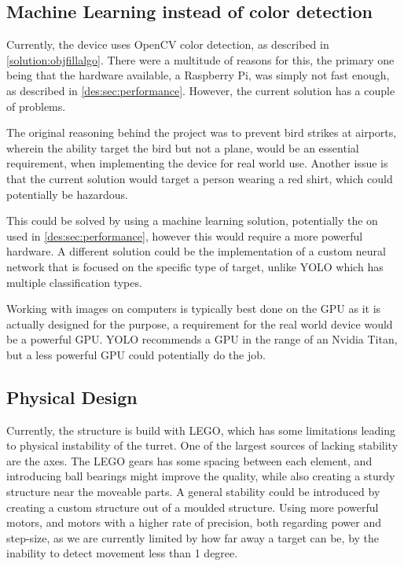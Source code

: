 \subsection{Machine Learning instead of color detection}

Currently, the device uses OpenCV color detection, as described in \autoref{solution:objfillalgo}.
There were a multitude of reasons for this, the primary one being that the hardware available, a Raspberry Pi, was simply not fast enough, as described in \autoref{des:sec:performance}.
However, the current solution has a couple of problems.

The original reasoning behind the project was to prevent bird strikes at airports, wherein the ability target the bird but not a plane, would be an essential requirement, when implementing the device for real world use.
Another issue is that the current solution would target a person wearing a red shirt, which could potentially be hazardous.

This could be solved by using a machine learning solution, potentially the on used in \autoref{des:sec:performance}, however this would require a more powerful hardware.
A different solution could be the implementation of a custom neural network that is focused on the specific type of target, unlike YOLO which has multiple classification types.

Working with images on computers is typically best done on the GPU as it is actually designed for the purpose, a requirement for the real world device would be a powerful GPU.
YOLO recommends a GPU in the range of an Nvidia Titan, but a less powerful GPU could potentially do the job.

\subsection{Physical Design}
Currently, the structure is build with LEGO, which has some limitations leading to physical instability of the turret.
One of the largest sources of lacking stability are the axes.
The LEGO gears has some spacing between each element, and introducing ball bearings might improve the quality, while also creating a sturdy structure near the moveable parts.
A general stability could be introduced by creating a custom structure out of a moulded structure.
Using more powerful motors, and motors with a higher rate of precision, both regarding power and step-size, as we are currently limited by how far away a target can be, by the inability to detect movement less than 1 degree.

